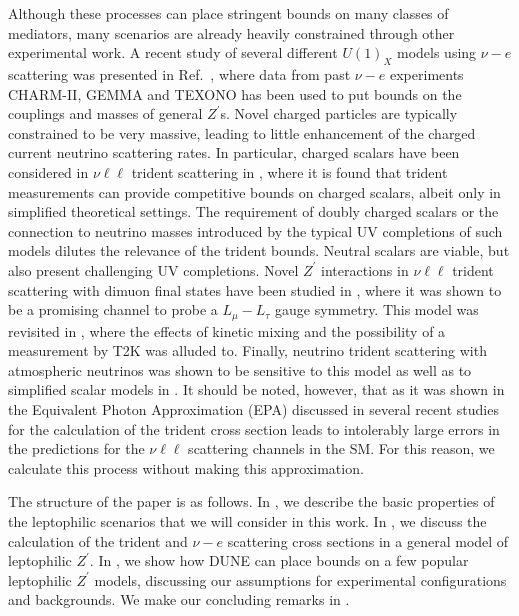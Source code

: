 Although these processes can place stringent bounds on many classes of mediators, many scenarios are already heavily constrained through other experimental work. A recent study of several different $U(1)_X$ models using $\nu-e$ scattering was presented in Ref.~\cite{Lindner:2018kjo}, where data from past $\nu-e$ experiments CHARM-II, GEMMA and TEXONO has been used to put bounds on the couplings and masses of general $Z^\prime$s. Novel charged particles are typically constrained to be very massive, leading to little enhancement of the charged current neutrino scattering rates. In particular, charged scalars have been considered in $\nu\ell\ell$ trident scattering in , where it is found that trident measurements can provide competitive bounds on charged scalars, albeit only in simplified theoretical settings. The requirement of doubly charged scalars or the connection to neutrino masses introduced by the typical UV completions of such models dilutes the relevance of the trident bounds. Neutral scalars are viable, but also present challenging UV completions. Novel $Z^\prime$ interactions in $\nu\ell\ell$ trident scattering with dimuon final states have been studied in , where it was shown to be a promising channel to probe a $L_\mu-L_\tau$ gauge symmetry. This model was revisited in , where the effects of kinetic mixing and the possibility of a measurement by T2K was alluded to. Finally, neutrino trident scattering with atmospheric neutrinos was shown to be sensitive to this model as well as to simplified scalar models in \cite{Ge:2017poy}. It should be noted, however, that as it was shown in  the Equivalent Photon Approximation (EPA) discussed in several recent studies \cite{Magill:2017mps, Kaneta:2016uyt} for the calculation of the trident cross section leads to intolerably large errors in the predictions for the $\nu\ell\ell$ scattering channels in the SM. For this reason, we calculate this process without making this approximation.

The structure of the paper is as follows. In , we describe the basic properties of the leptophilic scenarios that we will consider in this work. In , we discuss the calculation of the trident and $\nu-e$ scattering cross sections in a general model of leptophilic $Z^\prime$. In , we show how DUNE can place bounds on a few popular leptophilic $Z^\prime$ models, discussing our assumptions for experimental configurations and backgrounds. We make our concluding remarks in .

